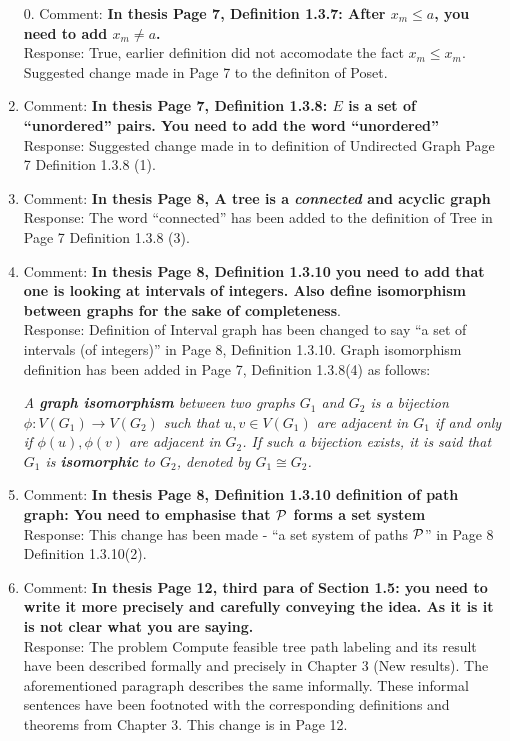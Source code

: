 \documentclass{article}
\begin{document}
\begin{enumerate}
\item[0.] Comment: {\bf In thesis Page 7, Definition 1.3.7: After $x_m
    \le a$, you need to add $x_m \ne a$.}\\
  Response: True, earlier definition did not accomodate the fact $x_m
  \le x_m$. Suggested change made in Page 7 to the definiton of Poset.

\item Comment: {\bf In thesis Page 7, Definition 1.3.8: $E$ is a set
    of ``unordered'' pairs. You need to add the
    word ``unordered''}\\
  Response: Suggested change made in to definition of Undirected Graph
  Page 7 Definition 1.3.8 (1).

\item Comment: {\bf In thesis Page 8, A tree is a {\em connected} and
    acyclic graph}\\
  Response: The word ``connected'' has been added to the definition of
  Tree in Page 7 Definition 1.3.8 (3).

\item Comment: {\bf In thesis Page 8, Definition 1.3.10 you need to
    add that one is looking at intervals of integers. Also define
    isomorphism between graphs for the sake of completeness}.\\
  Response: Definition of Interval graph has been changed to say ``a
  set of intervals (of integers)'' in Page 8, Definition 1.3.10. Graph
  isomorphism definition has been added in Page 7, Definition 1.3.8(4)
  as follows:

  {\em A \textbf{graph isomorphism} between two graphs $G_1$ and $G_2$
    is a bijection $\phi: V(G_1) \rightarrow V(G_2)$ such that $u, v
    \in V(G_1)$ are adjacent in $G_1$ if and only if $\phi(u),
    \phi(v)$ are adjacent in $G_2$. If such a bijection exists, it is
    said that $G_1$ is \textbf{isomorphic} to $G_2$, denoted by $G_1
    \cong G_2$.}

\item Comment: {\bf In thesis Page 8, Definition 1.3.10 definition of
    path graph: You need to emphasise that ${\cal P}$ forms a set system}\\
  Response: This change has been made - ``a set system of paths
  ${\cal P}$'' in Page 8 Definition 1.3.10(2).

\item Comment: {\bf In thesis Page 12, third para of Section 1.5: you
    need to write it more precisely and carefully conveying the
    idea. As it is it is not clear what you are saying.}\\
  Response: The problem {\sc Compute feasible tree path labeling} and
  its result have been described formally and precisely in Chapter 3
  (New results). The aforementioned paragraph describes the same
  informally. These informal sentences have been footnoted with the
  corresponding definitions and theorems from Chapter 3. This change
  is in Page 12.


\end{enumerate}
\end{document}
